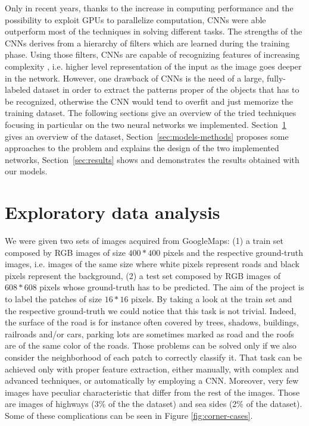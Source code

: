 \documentclass[10pt,conference,compsocconf]{IEEEtran}
\begin{document}
Only in recent years, thanks to the increase in computing performance and the possibility to exploit GPUs to parallelize computation, CNNs were able outperform most of the techniques in solving different tasks. The strengths of the CNNs derives from a hierarchy of filters which are learned during the training phase. Using those filters, CNNs are capable of recognizing features of increasing complexity , i.e. higher level representation of the input as the image goes deeper in the network. However, one drawback of CNNs is the need of a large, fully-labeled dataset in order to extract the patterns proper of the objects that has to be recognized, otherwise the CNN would tend to overfit and just memorize the training dataset.
The following sections give an overview of the tried techniques focusing in particular on the two neural networks we implemented. Section~\ref{sec:data-analysis} gives an overview of the dataset, Section~\ref{sec:models-methods} proposes some approaches to the problem and explains the design of the two implemented networks, Section~\ref{sec:results} shows and demonstrates the results obtained with our models.

\section{Exploratory data analysis}
\label{sec:data-analysis}
We were given two sets of images acquired from GoogleMaps: (1) a train set composed by RGB images of size $400*400$ pixels and the respective ground-truth images, i.e. images of the same size where white pixels represent roads and black pixels represent the background, (2) a test set composed by RGB images of $608*608$ pixels whose ground-truth has to be predicted.
The aim of the project is to label the patches of size $16*16$ pixels. By taking a look at the train set and the respective ground-truth we could notice that this task is not trivial. Indeed, the surface of the road is for instance often covered by trees, shadows, buildings, railroads and/or cars, parking lots are sometimes marked as road and the roofs are of the same color of the roads. Those problems can be solved only if we also consider the neighborhood of each patch to correctly classify it. That task can be achieved only with proper feature extraction, either manually, with complex and advanced techniques, or automatically by employing a CNN. Moreover, very few images have peculiar characteristic that differ from the rest of the images. Those are images of highways (3\% of the the dataset) and sea sides (2\% of the dataset). Some of these complications can be seen in Figure \ref{fig:corner-cases}.
\end{document}
